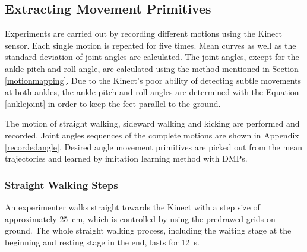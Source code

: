 \subsection{Extracting Movement Primitives}
\label{extractingprimitive}
Experiments are carried out by recording different motions using the Kinect sensor. Each single motion is repeated for five times. Mean curves as well as the standard deviation of joint angles are calculated. The joint angles, except for the ankle pitch and roll angle, are calculated using the method mentioned in Section {\ref{motionmapping}}. Due to the Kinect's poor ability of detecting subtle movements at both ankles, the ankle pitch and roll angles are determined with the Equation {\ref{anklejoint}} in order to keep the feet parallel to the ground.

The motion of straight walking, sideward walking and kicking are performed and recorded. Joint angles sequences of the complete motions are shown in Appendix {\ref{recordedangle}}. Desired angle movement primitives are picked out from the mean trajectories and learned by imitation learning method with DMPs.

\subsubsection{Straight Walking Steps}
An experimenter walks straight towards the Kinect with a step size of approximately \SI{25}{cm}, which is controlled by using the predrawed grids on ground. The whole straight walking process, including the waiting stage at the beginning and resting stage in the end, lasts for \SI{12}{\second}.



